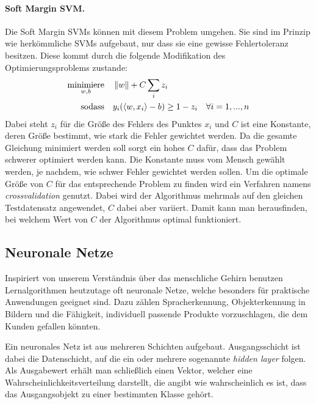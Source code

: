\paragraph{Soft Margin SVM.}
Die Soft Margin SVMs können mit diesem Problem umgehen.
Sie sind im Prinzip wie herkömmliche SVMs aufgebaut, nur dass sie eine gewisse Fehlertoleranz besitzen. Diese kommt durch die folgende Modifikation des Optimierungsproblems zustande:
\begin{align*}
	\underset{w,b}{\operatorname{minimiere}} \quad & \left\lVert w\right\rVert + C\sum_{i}{z_{i}} \\
	\operatorname{sodass} \quad & y_{i}(\langle w,x_{i} \rangle - b) \geq 1 - z_{i} \quad \forall i = 1,...,n
\end{align*}
Dabei steht $z_{i}$ für die Grö\ss e des Fehlers des Punktes $x_{i}$ und $C$ ist eine Konstante, deren Grö\ss e bestimmt, wie stark die Fehler gewichtet werden. Da die gesamte Gleichung minimiert werden soll sorgt ein hohes $C$ dafür, dass das Problem schwerer optimiert werden kann. Die Konstante muss vom Mensch gewählt werden, je nachdem, wie schwer Fehler gewichtet werden sollen.
Um die optimale Größe von $C$ für das entsprechende Problem zu finden wird ein Verfahren namens \emph{crossvalidation} genutzt. Dabei wird der Algorithmus mehrmals auf den gleichen Testdatensatz angewendet, $C$ dabei aber variiert. Damit kann man herausfinden, bei welchem Wert von $C$ der Algorithmus optimal funktioniert.


\subsection{Neuronale Netze}

Inspiriert von unserem Verständnis über das menschliche Gehirn benutzen Lernalgorithmen heutzutage oft neuronale Netze, welche besonders für praktische Anwendungen geeignet sind. Dazu zählen Spracherkennung, Objekterkennung in Bildern und die Fähigkeit, individuell passende Produkte vorzuschlagen, die dem Kunden gefallen könnten.  






Ein neuronales Netz ist aus mehreren Schichten aufgebaut. Ausgangsschicht ist dabei die Datenschicht, auf die ein oder mehrere sogenannte \emph{hidden layer} folgen. Als Ausgabewert erhält man schließlich einen Vektor, welcher eine Wahrscheinlichkeitsverteilung darstellt, die angibt wie wahrscheinlich es ist, dass das Ausgangsobjekt zu einer bestimmten Klasse gehört.

